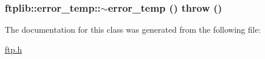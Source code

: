 \hypertarget{classftplib_1_1error__temp_eb3e3828117a6c872688e9ec508e9b68}{
\subsubsection[{$\sim$error\_\-temp}]{\setlength{\rightskip}{0pt plus 5cm}ftplib::error\_\-temp::$\sim$error\_\-temp ()  throw ()}}
\label{classftplib_1_1error__temp_eb3e3828117a6c872688e9ec508e9b68}




The documentation for this class was generated from the following file:\begin{CompactItemize}
\item 
\hyperlink{ftp_8h}{ftp.h}\end{CompactItemize}
